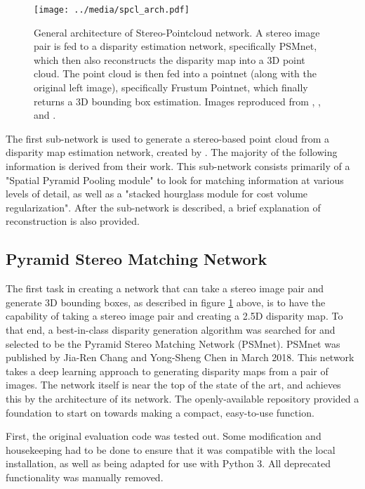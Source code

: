 \begin{figure}[ht]
	\centering
	\texttt{[image: ../media/spcl\_arch.pdf]}
	\caption{General architecture of Stereo-Pointcloud network. A stereo image pair is fed to a disparity estimation network, specifically PSMnet, which then also reconstructs the disparity map into a 3D point cloud. The point cloud is then fed into a pointnet (along with the original left image), specifically Frustum Pointnet, which finally returns a 3D bounding box estimation. Images reproduced from \cite{geiger_are_2012}, \cite{chang_pyramid_2018}, and \cite{qi_frustum_2017}.}
	\label{spcl_arch}
\end{figure}

The first sub-network is used to generate a stereo-based point cloud from a disparity map estimation network, created by \cite{chang_pyramid_2018}. The majority of the following information is derived from their work. This sub-network consists primarily of a "Spatial Pyramid Pooling module" to look for matching information at various levels of detail, as well as a "stacked hourglass module for cost volume regularization". After the sub-network is described, a brief explanation of reconstruction is also provided. 

\subsection{Pyramid Stereo Matching Network}
The first task in creating a network that can take a stereo image pair and generate 3D bounding boxes, as described in figure \ref{spcl_arch} above, is to have the capability of taking a stereo image pair and creating a 2.5D disparity map. To that end, a best-in-class disparity generation algorithm was searched for and selected to be the Pyramid Stereo Matching Network (PSMnet). PSMnet was published by Jia-Ren Chang and Yong-Sheng Chen in March 2018. This network takes a deep learning approach to generating disparity maps from a pair of images. The network itself is near the top of the state of the art, and achieves this by the architecture of its network. The openly-available repository provided a foundation to start on towards making a compact, easy-to-use function.

First, the original evaluation code was tested out. Some modification and housekeeping had to be done to ensure that it was compatible with the local installation, as well as being adapted for use with Python 3. All deprecated functionality was manually removed.

